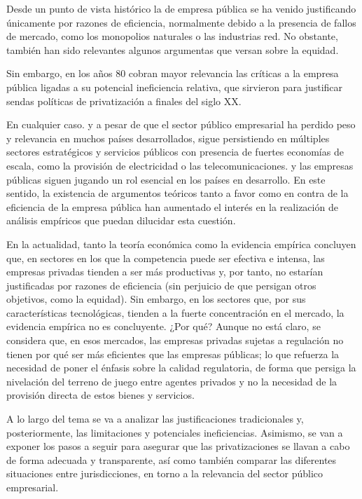\documentclass[10pt,a4paper]{article}
\begin{document}
Desde un punto de vista histórico la de empresa pública se ha venido justificando únicamente por razones de eficiencia, normalmente debido a la presencia de fallos de mercado, como los monopolios naturales o las industrias red. No obstante, también han sido relevantes algunos argumentas que versan sobre la equidad. 

Sin embargo, en los años 80 cobran mayor relevancia las críticas a la empresa pública ligadas a su potencial ineficiencia relativa, que sirvieron para justificar sendas políticas de privatización a finales del siglo XX.

En cualquier caso. y a pesar de que el sector público empresarial ha perdido peso y relevancia en muchos países desarrollados, sigue persistiendo en múltiples sectores estratégicos y servicios públicos con presencia de fuertes economías de escala, como la provisión de electricidad o las telecomunicaciones. y las empresas públicas siguen jugando un rol esencial en los países en desarrollo. En este sentido, la existencia de argumentos teóricos tanto a favor como en contra de la eficiencia de la empresa pública han aumentado el interés en la realización de análisis empíricos que puedan dilucidar esta cuestión.

En la actualidad, tanto la teoría económica como la evidencia empírica concluyen que, en sectores en los que la competencia puede ser efectiva e intensa, las empresas privadas tienden a ser más productivas y, por tanto, no estarían justificadas por razones de eficiencia (sin perjuicio de que persigan otros objetivos, como la equidad). Sin embargo, en los sectores que, por sus características tecnológicas, tienden a la fuerte concentración en el mercado, la evidencia empírica no es concluyente. ¿Por qué? Aunque no está claro, se considera que, en esos mercados, las empresas privadas sujetas a regulación no tienen por qué ser más eficientes que las empresas públicas; lo que refuerza la necesidad de poner el énfasis sobre la calidad regulatoria, de forma que persiga la nivelación del terreno de juego entre agentes privados y no la necesidad de la provisión directa de estos bienes y servicios.

A lo largo del tema se va a analizar las justificaciones tradicionales y, posteriormente, las limitaciones y potenciales ineficiencias. Asimismo, se van a exponer los pasos a seguir para asegurar que las privatizaciones se llavan a cabo de forma adecuada y transparente, así como también comparar las diferentes situaciones entre jurisdicciones, en torno a la relevancia del sector público empresarial.
\end{document}
